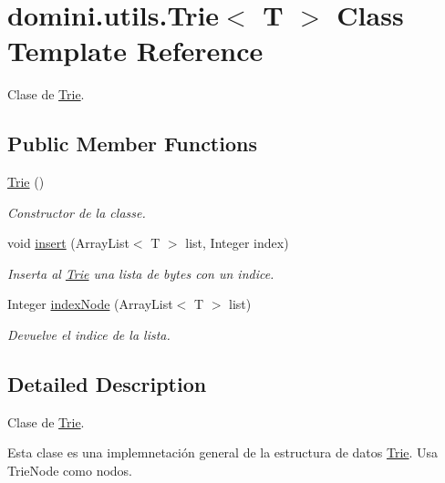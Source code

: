 \hypertarget{classdomini_1_1utils_1_1Trie}{}\section{domini.\+utils.\+Trie$<$ T $>$ Class Template Reference}
\label{classdomini_1_1utils_1_1Trie}


Clase de \hyperlink{classdomini_1_1utils_1_1Trie}{Trie}.  


\subsection*{Public Member Functions}
\begin{DoxyCompactItemize}
\item 
\mbox{\label{classdomini_1_1utils_1_1Trie_aa47b21b235e9dab115f3f97726837d5f}} 
\hyperlink{classdomini_1_1utils_1_1Trie_aa47b21b235e9dab115f3f97726837d5f}{Trie} ()
\begin{DoxyCompactList}\small\item\em Constructor de la classe. \end{DoxyCompactList}\item 
void \hyperlink{classdomini_1_1utils_1_1Trie_a3599001d9b056f0b54ab7eabb9d3510b}{insert} (Array\+List$<$ T $>$ list, Integer index)
\begin{DoxyCompactList}\small\item\em Inserta al \hyperlink{classdomini_1_1utils_1_1Trie}{Trie} una lista de bytes con un indice. \end{DoxyCompactList}\item 
Integer \hyperlink{classdomini_1_1utils_1_1Trie_a5c30e36df9ab804bbc054805358ecf2a}{index\+Node} (Array\+List$<$ T $>$ list)
\begin{DoxyCompactList}\small\item\em Devuelve el indice de la lista. \end{DoxyCompactList}\end{DoxyCompactItemize}


\subsection{Detailed Description}
Clase de \hyperlink{classdomini_1_1utils_1_1Trie}{Trie}. 

Esta clase es una implemnetación general de la estructura de datos \hyperlink{classdomini_1_1utils_1_1Trie}{Trie}. Usa Trie\+Node como nodos.

